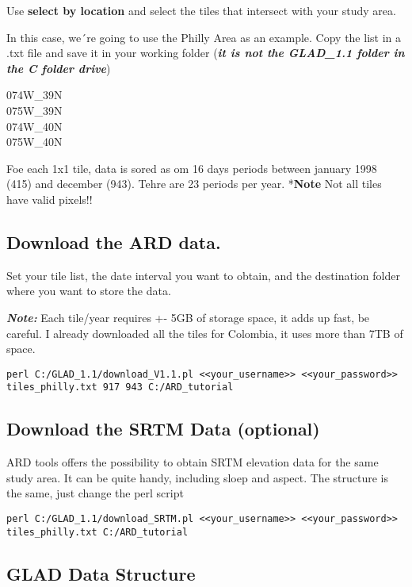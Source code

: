 \documentclass[]{article}
\begin{document}
Use \textbf{select by location} and select the tiles that intersect with
your study area.

In this case, we´re going to use the Philly Area as an example. Copy the
list in a .txt file and save it in your working folder (\textbf{\emph{it
is not the GLAD\_1.1 folder in the C folder drive}})

074W\_39N\\
075W\_39N\\
074W\_40N\\
075W\_40N

Foe each 1x1 tile, data is sored as om 16 days periods between january
1998 (415) and december (943). Tehre are 23 periods per year.
*\textbf{Note} Not all tiles have valid pixels!!

\hypertarget{download-the-ard-data.}{%
\subsection{Download the ARD data.}\label{download-the-ard-data.}}

Set your tile list, the date interval you want to obtain, and the
destination folder where you want to store the data.

\textbf{\emph{Note:}} Each tile/year requires +- 5GB of storage space,
it adds up fast, be careful. I already downloaded all the tiles for
Colombia, it uses more than 7TB of space.

\begin{verbatim}
perl C:/GLAD_1.1/download_V1.1.pl <<your_username>> <<your_password>> tiles_philly.txt 917 943 C:/ARD_tutorial
\end{verbatim}

\hypertarget{download-the-srtm-data-optional}{%
\subsection{Download the SRTM Data
(optional)}\label{download-the-srtm-data-optional}}

ARD tools offers the possibility to obtain SRTM elevation data for the
same study area. It can be quite handy, including sloep and aspect. The
structure is the same, just change the perl script

\begin{verbatim}
perl C:/GLAD_1.1/download_SRTM.pl <<your_username>> <<your_password>> tiles_philly.txt C:/ARD_tutorial
\end{verbatim}

\hypertarget{glad-data-structure}{%
\subsection{GLAD Data Structure}\label{glad-data-structure}}
\end{document}
